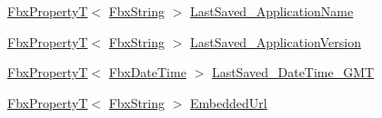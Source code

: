 \begin{Indent}
\begin{DoxyCompactItemize}
\item 
\hyperlink{class_fbx_property_t}{Fbx\+PropertyT}$<$ \hyperlink{class_fbx_string}{Fbx\+String} $>$ \hyperlink{class_fbx_document_info_a336bfd3129c31d0739e87e19a344035b}{Last\+Saved\+\_\+\+Application\+Name}
\item 
\hyperlink{class_fbx_property_t}{Fbx\+PropertyT}$<$ \hyperlink{class_fbx_string}{Fbx\+String} $>$ \hyperlink{class_fbx_document_info_a5cffe99a205491edc2a53cf4dfe6d7ff}{Last\+Saved\+\_\+\+Application\+Version}
\item 
\hyperlink{class_fbx_property_t}{Fbx\+PropertyT}$<$ \hyperlink{class_fbx_date_time}{Fbx\+Date\+Time} $>$ \hyperlink{class_fbx_document_info_a46e21e243dfdbfed83cac11774671ac4}{Last\+Saved\+\_\+\+Date\+Time\+\_\+\+G\+MT}
\item 
\hyperlink{class_fbx_property_t}{Fbx\+PropertyT}$<$ \hyperlink{class_fbx_string}{Fbx\+String} $>$ \hyperlink{class_fbx_document_info_a650c0d0532a87408ccea6607a2c437bf}{Embedded\+Url}
\end{DoxyCompactItemize}
\end{Indent}
